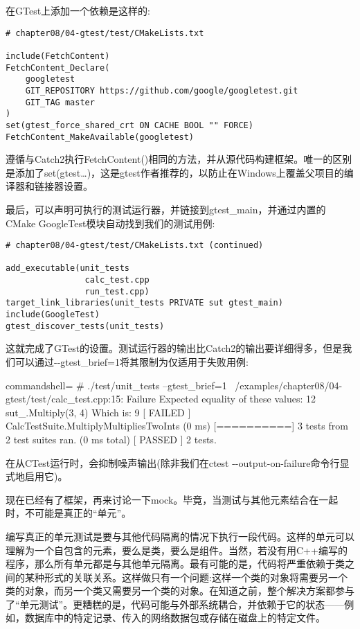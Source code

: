 在GTest上添加一个依赖是这样的:

\begin{lstlisting}[style=styleCMake]
# chapter08/04-gtest/test/CMakeLists.txt

include(FetchContent)
FetchContent_Declare(
	googletest
	GIT_REPOSITORY https://github.com/google/googletest.git
	GIT_TAG master
)
set(gtest_force_shared_crt ON CACHE BOOL "" FORCE)
FetchContent_MakeAvailable(googletest)
\end{lstlisting}

遵循与Catch2执行FetchContent()相同的方法，并从源代码构建框架。唯一的区别是添加了set(gtest…)，这是gtest作者推荐的，以防止在Windows上覆盖父项目的编译器和链接器设置。

最后，可以声明可执行的测试运行器，并链接到gtest\_main，并通过内置的CMake GoogleTest模块自动找到我们的测试用例:

\begin{lstlisting}[style=styleCMake]
# chapter08/04-gtest/test/CMakeLists.txt (continued)
	
add_executable(unit_tests
				calc_test.cpp
				run_test.cpp)
target_link_libraries(unit_tests PRIVATE sut gtest_main)
include(GoogleTest)
gtest_discover_tests(unit_tests)
\end{lstlisting}

这就完成了GTest的设置。测试运行器的输出比Catch2的输出要详细得多，但是我们可以通过-{}-gtest\_brief=1将其限制为仅适用于失败用例:

\begin{tcblisting}{commandshell={}}
# ./test/unit_tests --gtest_brief=1
~/examples/chapter08/04-gtest/test/calc_test.cpp:15: Failure
Expected equality of these values:
  12
  sut_.Multiply(3, 4)
    Which is: 9
[ FAILED ] CalcTestSuite.MultiplyMultipliesTwoInts (0 ms)
[==========] 3 tests from 2 test suites ran. (0 ms total)
[ PASSED ] 2 tests.
\end{tcblisting}

在从CTest运行时，会抑制噪声输出(除非我们在ctest -{}-output-on-failure命令行显式地启用它)。

现在已经有了框架，再来讨论一下mock。毕竟，当测试与其他元素结合在一起时，不可能是真正的“单元”。


编写真正的单元测试是要与其他代码隔离的情况下执行一段代码。这样的单元可以理解为一个自包含的元素，要么是类，要么是组件。当然，若没有用C++编写的程序，那么所有单元都是与其他单元隔离。最有可能的是，代码将严重依赖于类之间的某种形式的关联关系。这样做只有一个问题:这样一个类的对象将需要另一个类的对象，而另一个类又需要另一个类的对象。在知道之前，整个解决方案都参与了“单元测试”。更糟糕的是，代码可能与外部系统耦合，并依赖于它的状态——例如，数据库中的特定记录、传入的网络数据包或存储在磁盘上的特定文件。

